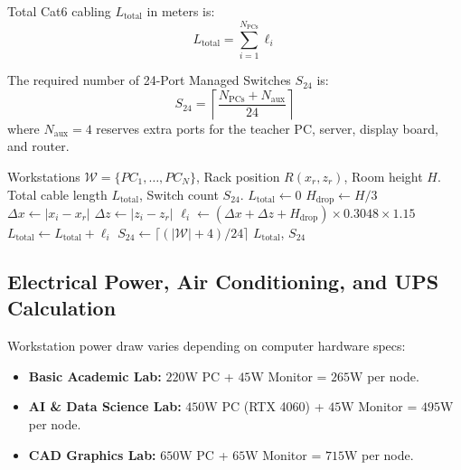 \documentclass[conference]{IEEEtran}
\begin{document}
Total Cat6 cabling $L_{\text{total}}$ in meters is:
\begin{equation}
L_{\text{total}} = \sum_{i=1}^{N_{\text{PCs}}} \ell_i
\end{equation}

The required number of 24-Port Managed Switches $S_{24}$ is:
\begin{equation}
S_{24} = \left\lceil \frac{N_{\text{PCs}} + N_{\text{aux}}}{24} \right\rceil
\end{equation}
where $N_{\text{aux}} = 4$ reserves extra ports for the teacher PC, server, display board, and router.

\begin{algorithm}[h]
\caption{Cable Distance and Switch Sizing Algorithm}
\label{alg:cabling}
\begin{algorithmic}[1]
\REQUIRE Workstations $\mathcal{W} = \{PC_1, \dots, PC_N\}$, Rack position $R(x_r, z_r)$, Room height $H$.
\ENSURE Total cable length $L_{\text{total}}$, Switch count $S_{24}$.
\STATE $L_{\text{total}} \leftarrow 0$
\STATE $H_{\text{drop}} \leftarrow H / 3$
    \STATE $\Delta x \leftarrow |x_i - x_r|$
    \STATE $\Delta z \leftarrow |z_i - z_r|$
    \STATE $\ell_i \leftarrow (\Delta x + \Delta z + H_{\text{drop}}) \times 0.3048 \times 1.15$
    \STATE $L_{\text{total}} \leftarrow L_{\text{total}} + \ell_i$
\ENDFOR
\STATE $S_{24} \leftarrow \lceil (|\mathcal{W}| + 4) / 24 \rceil$
\RETURN $L_{\text{total}}$, $S_{24}$
\end{algorithmic}
\end{algorithm}

\subsection{Electrical Power, Air Conditioning, and UPS Calculation}
Workstation power draw varies depending on computer hardware specs:
\begin{itemize}
    \item \textbf{Basic Academic Lab:} $220\text{W}$ PC + $45\text{W}$ Monitor = $265\text{W}$ per node.
    \item \textbf{AI \& Data Science Lab:} $450\text{W}$ PC (RTX 4060) + $45\text{W}$ Monitor = $495\text{W}$ per node.
    \item \textbf{CAD Graphics Lab:} $650\text{W}$ PC + $65\text{W}$ Monitor = $715\text{W}$ per node.
\end{itemize}
\end{document}
